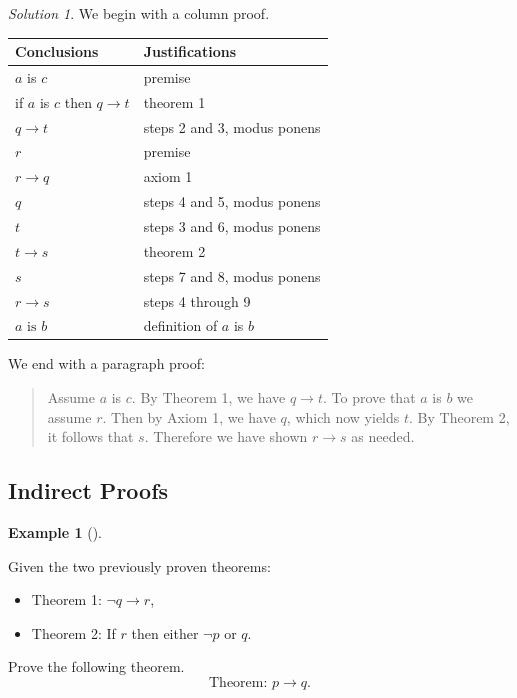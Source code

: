 \documentclass[
  letterpaper,
  10pt,
  reqno,
  twopage,
  openany]{book}
\providecommand{\tightlist}{%
  \setlength{\itemsep}{0pt}\setlength{\parskip}{0pt}}\usepackage{longtable,booktabs,array}
\theoremstyle{plain}
\theoremstyle{definition}
\theoremstyle{definition}
\theoremstyle{definition}
\newtheorem{example}{Example}[chapter]
\theoremstyle{plain}
\theoremstyle{plain}
\theoremstyle{remark}
\newtheorem*{solution}{Solution}
\begin{document}
\begin{solution}

We begin with a column proof.

\begin{longtable}[]{@{}ll@{}}
\toprule()
Conclusions & Justifications \\
\midrule()
\endhead
\(a\) is \(c\) & premise \\
if \(a\) is \(c\) then \(q\rightarrow t\) & theorem 1 \\
\(q\rightarrow t\) & steps 2 and 3, modus ponens \\
\(r\) & premise \\
\(r\rightarrow q\) & axiom 1 \\
\(q\) & steps 4 and 5, modus ponens \\
\(t\) & steps 3 and 6, modus ponens \\
\(t\rightarrow s\) & theorem 2 \\
\(s\) & steps 7 and 8, modus ponens \\
\(r\rightarrow s\) & steps 4 through 9 \\
\(a \text{ is } b\) & definition of \(a\) is \(b\) \\
\bottomrule()
\end{longtable}

We end with a paragraph proof:

\begin{quote}
Assume \(a\) is \(c\). By Theorem 1, we have \(q\rightarrow t\). To
prove that \(a\) is \(b\) we assume \(r\). Then by Axiom 1, we have
\(q\), which now yields \(t\). By Theorem 2, it follows that \(s\).
Therefore we have shown \(r\rightarrow s\) as needed.
\end{quote}

\end{solution}

\hypertarget{indirect-proofs}{%
\subsection{Indirect Proofs}\label{indirect-proofs}}

\leavevmode{}%
\begin{example}[]\label{exm-indirect-proofs}

Given the two previously proven theorems:

\begin{itemize}
\tightlist
\item
  Theorem 1: \(\neg q\rightarrow r\),
\item
  Theorem 2: If \(r\) then either \(\neg p\) or \(q\).
\end{itemize}

Prove the following theorem. \[
\text{Theorem: $p\rightarrow q.$}
\]

\end{example}
\end{document}
